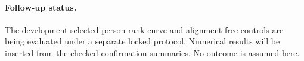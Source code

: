 \paragraph{Follow-up status.}
The development-selected person rank curve and alignment-free controls are
being evaluated under a separate locked protocol. Numerical results will be
inserted from the checked confirmation summaries. No outcome is assumed here.
